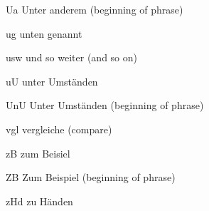 \documentclass[english,a4paper,DIV=12,parskip=full,oneside]{scrartcl}
\begin{document}
\begin{commandlist}
                \item[Ua] Unter anderem (beginning of phrase) \codeExample{\Ua}
                \item[ug] unten genannt \codeExample{\ug}
                \item[usw] und so weiter (and so on) \justCodeExample{\usw}
                \item[uU] unter Umständen \codeExample{\uU}
                \item[UnU] Unter Umständen (beginning of phrase) \codeExample{\UnU}
                \item[vgl] vergleiche (compare) \codeExample{\vgl}
                \item[zB] zum Beisiel \codeExample{\zB}
                \item[ZB] Zum Beispiel (beginning of phrase) \codeExample{\ZB}
                \item[zHd] zu Händen \codeExample{\zHd}
            \end{commandlist}
\end{document}
